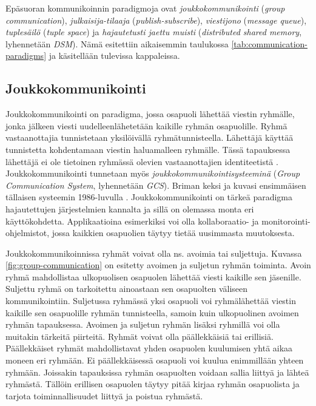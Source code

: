 Epäsuoran kommunikoinnin paradigmoja ovat \emph{joukkokommunikointi} (\emph{group communication}), \emph{julkaisija-tilaaja} (\emph{publish-subscribe}), \emph{viestijono} (\emph{message queue}), \emph{tuplesäilö} (\emph{tuple space}) ja \emph{hajautetusti jaettu muisti} (\emph{distributed shared memory}, lyhennetään \emph{DSM}). Nämä esitettiin aikaisemmin taulukossa \ref{tab:communication-paradigms} ja käsitellään tulevissa kappaleissa.


\subsection{Joukkokommunikointi}
Joukkokommunikointi on paradigma, jossa osapuoli lähettää viestin ryhmälle, jonka jälkeen viesti uudelleenlähetetään kaikille ryhmän osapuolille. Ryhmä vastaanottajia tunnistetaan yksilöivällä ryhmätunnisteella. Lähettäjä käyttää tunnistetta kohdentamaan viestin haluamalleen ryhmälle. Tässä tapauksessa lähettäjä ei ole tietoinen ryhmässä olevien vastaanottajien identiteetistä \cite[s.~232--233]{distributed-systems-concepts-and-design}. Joukkokommunikointi tunnetaan myös \emph{joukkokommunikointisysteeminä} (\emph{Group Communication System}, lyhennetään \emph{GCS}). Briman keksi ja kuvasi ensimmäisen tällaisen systeemin 1986-luvulla \cite{isis-fault-tolerant-distributed-computing}. Joukkokommunikointi on tärkeä paradigma hajautettujen järjestelmien kannalta ja sillä on olemassa monta eri käyttökohdetta. Applikaatioina esimerkiksi voi olla kollaboraatio- ja monitorointi-ohjelmistot, jossa kaikkien osapuolien täytyy tietää uusimmasta muutoksesta.

Joukkokommunikoinnissa ryhmät voivat olla ns. avoimia tai suljettuja. Kuvassa \ref{fig:group-communication} on esitetty avoimen ja suljetun ryhmän toiminta. Avoin ryhmä mahdollistaa ulkopuolisen osapuolen lähettää viesti kaikille sen jäsenille. Suljettu ryhmä on tarkoitettu ainoastaan sen osapuolten väliseen kommunikointiin. Suljetussa ryhmässä yksi osapuoli voi ryhmälähettää viestin kaikille sen osapuolille ryhmän tunnisteella, samoin kuin ulkopuolinen avoimen ryhmän tapauksessa. Avoimen ja suljetun ryhmän lisäksi ryhmillä voi olla muitakin tärkeitä piirteitä. Ryhmät voivat olla päällekkäisiä tai erillisiä. Päällekkäiset ryhmät mahdollistavat yhden osapuolen kuulumisen yhtä aikaa moneen eri ryhmään. Ei päällekkäisessä osapuoli voi kuulua enimmillään yhteen ryhmään. Joissakin tapauksissa ryhmän osapuolten voidaan sallia liittyä ja lähteä ryhmästä. Tällöin erillisen osapuolen täytyy pitää kirjaa ryhmän osapuolista ja tarjota toiminnallisuudet liittyä ja poistua ryhmästä. \mbox{\cite[s.~233--235]{distributed-systems-concepts-and-design}} \mbox{\cite[s.~48]{process-group-approach-briman}}

